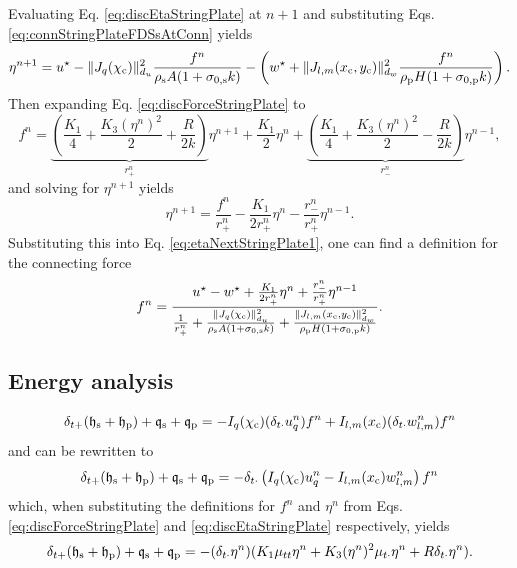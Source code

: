 Evaluating Eq. \eqref{eq:discEtaStringPlate} at $n+1$ and substituting Eqs. \eqref{eq:connStringPlateFDSsAtConn} yields
\begin{equation}\label{eq:etaNextStringPlate1}
    \eta^{n+1} = u^\star- \lVert J_q(\chi_\ctxt)\rVert_{d_u}^2\frac{f^n}{\rho_\stxt A(1+\szX[\stxt]k)} - \left(w^\star + \lVert J_{l, m}(x_\ctxt, y_\ctxt)\rVert_{d_w}^2\frac{f^n}{\rho_\ptxt H(1+\szX[\ptxt]k)}\right).
\end{equation}
Then expanding Eq. \eqref{eq:discForceStringPlate} to
\begin{equation*}
     f^n = \underbrace{\left(\frac{K_1}{4}+\frac{K_3(\eta^n)^2}{2} + \frac{R}{2k}\right)}_{r_+^n}\eta^{n+1} + \frac{K_1}{2}\eta^n + \underbrace{\left(\frac{K_1}{4}+\frac{K_3(\eta^n)^2}{2} - \frac{R}{2k}\right)}_{r_-^n}\eta^{n-1},
\end{equation*}
and solving for $\eta^{n+1}$ yields
\begin{equation}
    \eta^{n+1} = \frac{f^n}{r_+^n} - \frac{K_1}{2r_+^n}\eta^n - \frac{r_-^n}{r_+^n}\eta^{n-1}.
\end{equation}
Substituting this into Eq. \eqref{eq:etaNextStringPlate1}, one can find a definition for the connecting force
\begin{equation*}
    f^n = \frac{u^\star - w^\star + \frac{K_1}{2r_+^n}\eta^n + \frac{r_-^n}{r_+^n}\eta^{n-1}}{\frac{1}{r_+^n} + \frac{\lVert J_q(\chi_\ctxt)\rVert_{d_u}^2}{\rho_\stxt A(1+\szX[\stxt]k)} + \frac{\lVert J_{l, m}(x_\ctxt, y_\ctxt)\rVert_{d_w}^2}{\rho_\ptxt H(1+\szX[\ptxt]k)}}.
\end{equation*}

\SWcomment[FIGURE]

\subsection{Energy analysis}
\begin{equation}
    \delta_{t+}(\mathfrak{h}_{\text{s}} + \mathfrak{h}_{\text{p}}) + \mathfrak{q}_{\text{s}} + \mathfrak{q}_{\text{p}} = -I_q(\chi_{\text{c}}) (\delta_{t\cdot} u_q^n)f^n +I_{l,m}(x_{\text{c}})(\delta_{t\cdot} w_{l,m}^n)f^n
\end{equation}
and can be rewritten to
\begin{equation*}
    \delta_{t+}(\mathfrak{h}_{\text{s}} + \mathfrak{h}_{\text{p}}) + \mathfrak{q}_{\text{s}} + \mathfrak{q}_{\text{p}} = -\delta_{t\cdot} \left(I_q(\chi_{\text{c}}) u_q^n - I_{l,m}(x_{\text{c}})w_{l,m}^n\right)f^n
\end{equation*}
which, when substituting the definitions for $f^n$ and $\eta^n$ from Eqs. \eqref{eq:discForceStringPlate} and \eqref{eq:discEtaStringPlate} respectively, yields
\begin{equation*}
    \delta_{t+}(\mathfrak{h}_{\text{s}} + \mathfrak{h}_{\text{p}}) + \mathfrak{q}_{\text{s}} + \mathfrak{q}_{\text{p}} = -(\delta_{t\cdot}\eta^n)(K_1\mu_{tt}\eta^n+K_3(\eta^n)^2\mu_{t\cdot}\eta^n+R\delta_{t\cdot}\eta^n).
\end{equation*}

